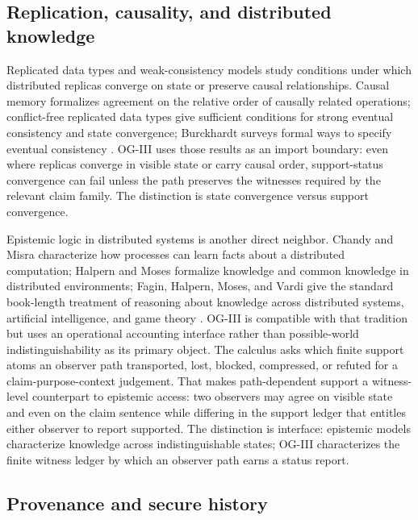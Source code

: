 \documentclass[11pt,twoside]{article}
\theoremstyle{definition}
\newcommand{\supported}{\mathrm{supported}}
\begin{document}
\subsection{Replication, causality, and distributed knowledge}

Replicated data types and weak-consistency models study conditions under which
distributed replicas converge on state or preserve causal relationships. Causal
memory formalizes agreement on the relative order of causally related
operations; conflict-free replicated data types give sufficient conditions for
strong eventual consistency and state convergence; Burckhardt surveys formal
ways to specify eventual consistency
\cite{ahamad_causal_memory_1995,shapiro_crdt_2011,burckhardt_eventual_2014}.
OG-III uses those results as an import boundary: even where replicas converge
in visible state or carry causal order, support-status convergence can fail
unless the path preserves the witnesses required by the relevant claim family.
The distinction is state convergence versus support convergence.

Epistemic logic in distributed systems is another direct neighbor. Chandy and
Misra characterize how processes can learn facts about a distributed
computation; Halpern and Moses formalize knowledge and common knowledge in
distributed environments; Fagin, Halpern, Moses, and Vardi give the standard
book-length treatment of reasoning about knowledge across distributed systems,
artificial intelligence, and game theory
\cite{chandy_processes_learn_1985,halpern_moses_knowledge_1990,fagin_reasoning_knowledge_1995}.
OG-III is compatible with that tradition but uses an operational accounting
interface rather than possible-world indistinguishability as its primary object.
The calculus asks which finite support atoms an observer path transported,
lost, blocked, compressed, or refuted for a claim-purpose-context judgement.
That makes path-dependent support a witness-level counterpart to epistemic
access: two observers may agree on visible state and even on the claim sentence
while differing in the support ledger that entitles either observer to report
$\supported$. The distinction is interface: epistemic models characterize
knowledge across indistinguishable states; OG-III characterizes the finite
witness ledger by which an observer path earns a status report.

\subsection{Provenance and secure history}
\end{document}
